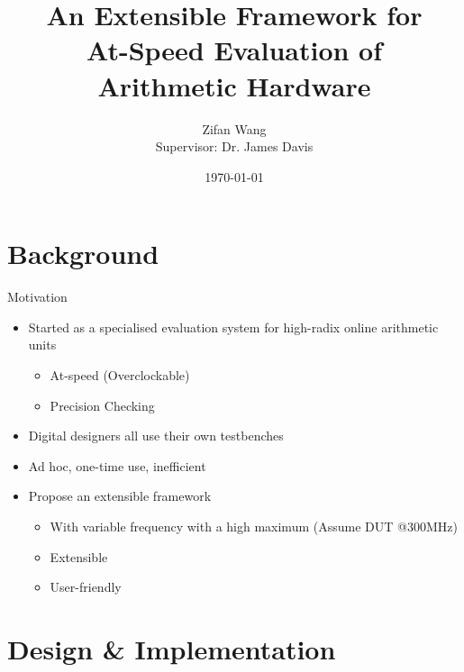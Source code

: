 \documentclass[t]{beamer}
\title[AAA]{An Extensible Framework for\\At-Speed Evaluation of\\Arithmetic Hardware}
\subtitle{}
\author[Zifan Wang]{Zifan Wang \texorpdfstring{\\}{} Supervisor: Dr. James Davis}
\institute[]{Imperial College London}
\date{\today}
\begin{document}
\begin{frame}
  \titlepage
\end{frame}

\begin{frame}
  \tableofcontents
\end{frame}

\section{Background}

\begin{frame}{Motivation}
  \begin{itemize}
    \item<+-> Started as a specialised evaluation system for high-radix online arithmetic units
    \begin{itemize}
      \item At-speed (Overclockable)
      \item Precision Checking
    \end{itemize}
    \item<+-> Digital designers all use their own testbenches
    \item<+-> Ad hoc, one-time use, inefficient \newline
    \item<+-> Propose an extensible framework
    \begin{itemize}
      \item With variable frequency with a high maximum (Assume DUT @300MHz)
      \item Extensible
      \item User-friendly
    \end{itemize}
  \end{itemize}
\end{frame}

\section{Design \& Implementation}
\end{document}

